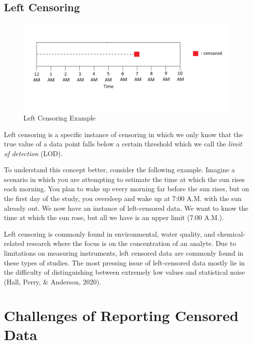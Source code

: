 \documentclass[12pt, twoside]{amherstthesis}
\begin{document}
\hypertarget{left}{%
\subsection{Left Censoring}\label{left}}
\begin{figure}

{\centering \includegraphics[width=1\linewidth]{figures/left_censoring_example_fix} 

}

\caption{Left Censoring Example}\label{fig:leftcensoringexample}
\end{figure}
Left censoring is a specific instance of censoring in which we only know that the true value of a data point falls below a certain threshold which we call the \emph{limit of detection} (LOD).

To understand this concept better, consider the following example. Imagine a scenario in which you are attempting to estimate the time at which the sun rises each morning. You plan to wake up every morning far before the sun rises, but on the first day of the study, you oversleep and wake up at 7:00 A.M. with the sun already out. We now have an instance of left-censored data. We want to know the time at which the sun rose, but all we have is an upper limit (7:00 A.M.).

Left censoring is commonly found in environmental, water quality, and chemical-related research where the focus is on the concentration of an analyte. Due to limitations on measuring instruments, left censored data are commonly found in these types of studies. The most pressing issue of left-censored data mostly lie in the difficulty of distinguishing between extremely low values and statistical noise (Hall, Perry, \& Anderson, 2020).

\hypertarget{challenges}{%
\section{Challenges of Reporting Censored Data}\label{challenges}}
\end{document}
